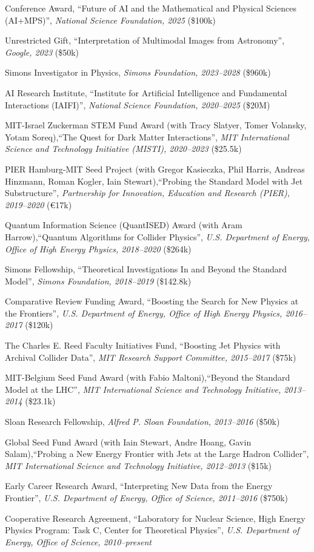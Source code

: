 \bbl
\item Conference Award, ``Future of AI and the Mathematical and Physical Sciences (AI+MPS)'', \textit{National Science Foundation, 2025}
(\$100k)
\item Unrestricted Gift, ``Interpretation of Multimodal Images from Astronomy'', \textit{Google, 2023}
(\$50k)
\item Simons Investigator in Physics, \textit{Simons Foundation, 2023--2028}
(\$960k)
\item AI Research Institute, ``Institute for Artificial Intelligence and Fundamental Interactions (IAIFI)'', \textit{National Science Foundation, 2020--2025}
(\$20M)
\item MIT-Israel Zuckerman STEM Fund Award (with Tracy Slatyer, Tomer Volansky, Yotam Soreq),``The Quest for Dark Matter Interactions'', \textit{MIT International Science and Technology Initiative (MISTI), 2020--2023}
(\$25.5k)
\item PIER Hamburg-MIT Seed Project (with Gregor Kasieczka, Phil Harris, Andreas Hinzmann, Roman Kogler, Iain Stewart),``Probing the Standard Model with Jet Substructure'', \textit{Partnership for Innovation, Education and Research (PIER), 2019--2020}
(\euro17k)
\item Quantum Information Science (QuantISED) Award (with Aram Harrow),``Quantum Algorithms for Collider Physics'', \textit{U.S. Department of Energy, Office of High Energy Physics, 2018--2020}
(\$264k)
\item Simons Fellowship, ``Theoretical Investigations In and Beyond the Standard Model'', \textit{Simons Foundation, 2018--2019}
(\$142.8k)
\item Comparative Review Funding Award, ``Boosting the Search for New Physics at the Frontiers'', \textit{U.S. Department of Energy, Office of High Energy Physics, 2016--2017}
(\$120k)
\item The Charles E. Reed Faculty Initiatives Fund, ``Boosting Jet Physics with Archival Collider Data'', \textit{MIT Research Support Committee, 2015--2017}
(\$75k)
\item MIT-Belgium Seed Fund Award (with Fabio Maltoni),``Beyond the Standard Model at the LHC'', \textit{MIT International Science and Technology Initiative, 2013--2014}
(\$23.1k)
\item Sloan Research Fellowship, \textit{Alfred P. Sloan Foundation, 2013--2016}
(\$50k)
\item Global Seed Fund Award (with Iain Stewart, Andre Hoang, Gavin Salam),``Probing a New Energy Frontier with Jets at the Large Hadron Collider'', \textit{MIT International Science and Technology Initiative, 2012--2013}
(\$15k)
\item Early Career Research Award, ``Interpreting New Data from the Energy Frontier'', \textit{U.S. Department of Energy, Office of Science, 2011--2016}
(\$750k)
\item Cooperative Research Agreement, ``Laboratory for Nuclear Science, High Energy Physics Program: Task C, Center for Theoretical Physics'', \textit{U.S. Department of Energy, Office of Science, 2010--present}

\el
